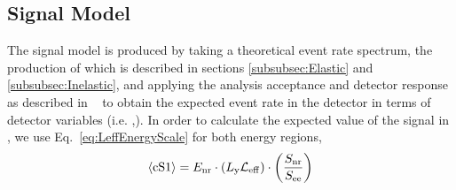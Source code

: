 \begin{table}

\caption{Definitions and contents of the analysis bins for the high energy channel. The expected background counts are calculated by taking the calibration sample and scaling it by $6.54\times10^{-3}$, which is the ratio of observed counts to calibration counts in a sideband.}  \label{table:BinDef} 
\end{table}






\subsection{Signal Model}
\label{subsec:SignalModel}
The signal model is produced by taking a theoretical event rate spectrum, the production of which is described in sections \ref{subsubsec:Elastic} and \ref{subsubsec:Inelastic}, and applying the analysis acceptance and detector response as described in ~\cite{Aprile:2012vw}  to obtain the expected event rate in the detector in terms of detector variables (i.e. \cSi,\cSiib). In order to calculate the expected value of the signal in \cSi, we use Eq.~\ref{eq:LeffEnergyScale} for both energy regions, 
\begin{equation}
\label{eq:LeffEnergyScale}
	\langle \mathrm{cS1} \rangle = E_{\mathrm{nr}} \cdot (L_{\mathrm{y}} \mathcal{L}_{\mathrm{eff}}) \cdot   \left(\frac{S_\mathrm{nr}}{S_\mathrm{ee}}\right) 
\end{equation}

